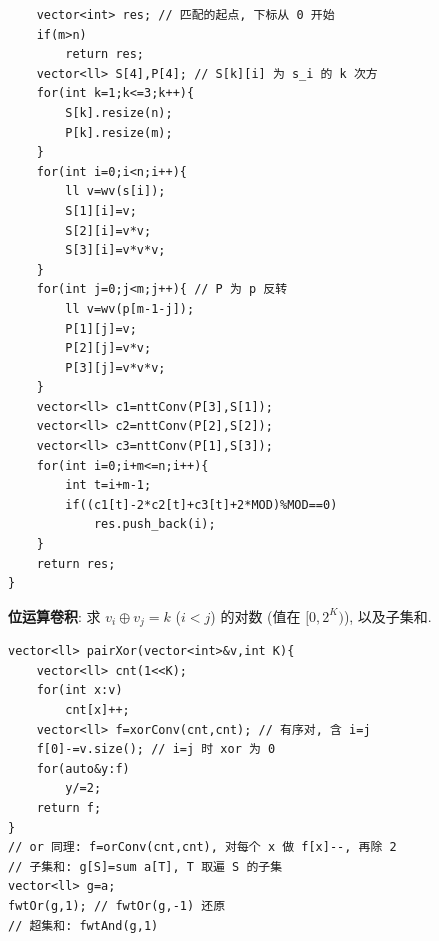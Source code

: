 \begin{compactitem}
\begin{lstlisting}
	vector<int> res; // 匹配的起点, 下标从 0 开始
	if(m>n)
		return res;
	vector<ll> S[4],P[4]; // S[k][i] 为 s_i 的 k 次方
	for(int k=1;k<=3;k++){
		S[k].resize(n);
		P[k].resize(m);
	}
	for(int i=0;i<n;i++){
		ll v=wv(s[i]);
		S[1][i]=v;
		S[2][i]=v*v;
		S[3][i]=v*v*v;
	}
	for(int j=0;j<m;j++){ // P 为 p 反转
		ll v=wv(p[m-1-j]);
		P[1][j]=v;
		P[2][j]=v*v;
		P[3][j]=v*v*v;
	}
	vector<ll> c1=nttConv(P[3],S[1]);
	vector<ll> c2=nttConv(P[2],S[2]);
	vector<ll> c3=nttConv(P[1],S[3]);
	for(int i=0;i+m<=n;i++){
		int t=i+m-1;
		if((c1[t]-2*c2[t]+c3[t]+2*MOD)%MOD==0)
			res.push_back(i);
	}
	return res;
}
\end{lstlisting}
\item \textbf{位运算卷积}: 求 $v_i \oplus v_j = k$ ($i < j$) 的对数 (值在 $[0, 2^K)$), 以及子集和.
\begin{lstlisting}
vector<ll> pairXor(vector<int>&v,int K){
	vector<ll> cnt(1<<K);
	for(int x:v)
		cnt[x]++;
	vector<ll> f=xorConv(cnt,cnt); // 有序对, 含 i=j
	f[0]-=v.size(); // i=j 时 xor 为 0
	for(auto&y:f)
		y/=2;
	return f;
}
// or 同理: f=orConv(cnt,cnt), 对每个 x 做 f[x]--, 再除 2
// 子集和: g[S]=sum a[T], T 取遍 S 的子集
vector<ll> g=a;
fwtOr(g,1); // fwtOr(g,-1) 还原
// 超集和: fwtAnd(g,1)
\end{lstlisting}
\end{compactitem}
